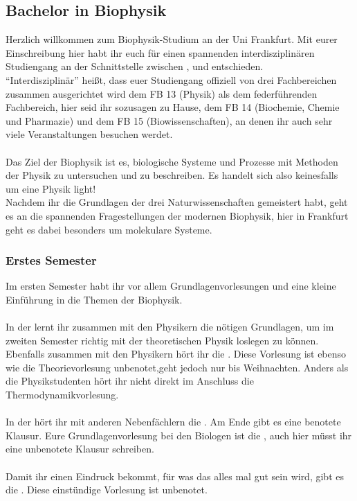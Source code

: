 \subsection{Bachelor in Biophysik}
\bigskip
%
Herzlich willkommen zum Biophysik-Studium an der Uni Frankfurt.
Mit eurer Einschreibung hier habt ihr euch für einen spannenden interdisziplinären Studiengang an der Schnittstelle zwischen ,  und  entschieden.\\
"`Interdisziplinär"' heißt, dass euer Studiengang offiziell von drei Fachbereichen zusammen ausgerichtet wird dem FB 13 (Physik) als dem federführenden Fachbereich, hier seid ihr sozusagen zu Hause, dem FB 14 (Biochemie, Chemie und Pharmazie) und dem FB 15 (Biowissenschaften), an denen ihr auch sehr viele Veranstaltungen besuchen werdet.\\
\bigskip\\
%
Das Ziel der Biophysik ist es, biologische Systeme und Prozesse mit Methoden der Physik zu untersuchen und zu beschreiben.
Es handelt sich also keinesfalls um eine Physik light!\\
Nachdem ihr die Grundlagen der drei Naturwissenschaften gemeistert habt,
geht es an die spannenden Fragestellungen der modernen Biophysik, hier in Frankfurt geht es dabei besonders um molekulare Systeme. 


\subsubsection{Erstes Semester}

Im ersten Semester habt ihr vor allem Grundlagenvorlesungen und eine kleine Einführung in die Themen der Biophysik. \\
\bigskip\\
%
In der  lernt ihr zusammen mit den Physikern die nötigen Grundlagen,
um im zweiten Semester richtig mit der theoretischen Physik loslegen zu können.
Ebenfalls zusammen mit den Physikern hört ihr die .
Diese Vorlesung ist ebenso wie die Theorievorlesung unbenotet,geht jedoch nur bis Weihnachten.
Anders als die Physikstudenten hört ihr nicht direkt im Anschluss die Thermodynamikvorlesung.\\
\bigskip\\
%
In der  hört ihr mit anderen Nebenfächlern die .
Am Ende gibt es eine benotete Klausur.
Eure Grundlagenvorlesung bei den Biologen ist die ,
auch hier müsst ihr eine unbenotete Klausur schreiben.\\ 
\bigskip\\
%
Damit ihr einen Eindruck bekommt, für was das alles mal gut sein wird, gibt es die .
Diese einstündige Vorlesung ist unbenotet.

